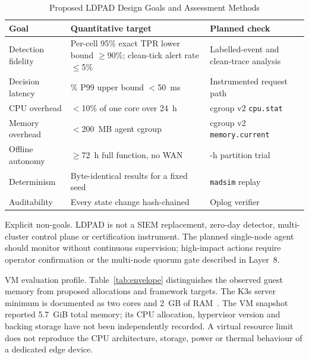 \documentclass{ieeeaccess}
\renewcommand{\textbf}[1]{#1}
\begin{document}
\begin{table}[ht]
\caption{Proposed LDPAD Design Goals and Assessment Methods}
\label{tab:goals}
\centering
\setlength{\tabcolsep}{3pt}
\begin{tabular}{|>{\raggedright\arraybackslash}p{58pt}|>{\raggedright\arraybackslash}p{62pt}|>{\raggedright\arraybackslash}p{58pt}|}
\hline
\textbf{Goal} & \textbf{Quantitative target} & \textbf{Planned check} \\
\hline
Detection fidelity & Per-cell 95\% exact TPR lower bound $\geq$90\%; clean-tick alert rate $\leq$5\% & Labelled-event and clean-trace analysis \\
\hline
Decision latency & 95\% P99 upper bound $<$50~ms & Instrumented request path \\
\hline
CPU overhead & $<$10\% of one core over 24~h & cgroup v2 \texttt{cpu.stat} \\
\hline
Memory overhead & $<$200~MB agent cgroup & cgroup v2 \texttt{memory.}\allowbreak\texttt{current} \\
\hline
Offline autonomy & $\geq$72~h full function, no WAN & 72-h partition trial \\
\hline
Determinism & Byte-identical results for a fixed seed & \texttt{madsim} replay \\
\hline
Auditability & Every state change hash-chained & Oplog verifier \\
\hline
\end{tabular}
\end{table}

\noindent\textbf{Explicit non-goals.} LDPAD is not a SIEM replacement, zero-day detector, multi-cluster control plane or certification instrument. The planned single-node agent should monitor without continuous supervision; high-impact actions require operator confirmation or the multi-node quorum gate described in Layer~8.

\noindent\textbf{VM evaluation profile.} Table~\ref{tab:envelope} distinguishes the observed guest memory from proposed allocations and framework targets. The K3s server minimum is documented as two cores and 2~GB of RAM~\cite{b_k3s_requirements}. The VM snapshot reported 5.7~GiB total memory; its CPU allocation, hypervisor version and backing storage have not been independently recorded. A virtual resource limit does not reproduce the CPU architecture, storage, power or thermal behaviour of a dedicated edge device.
\end{document}
